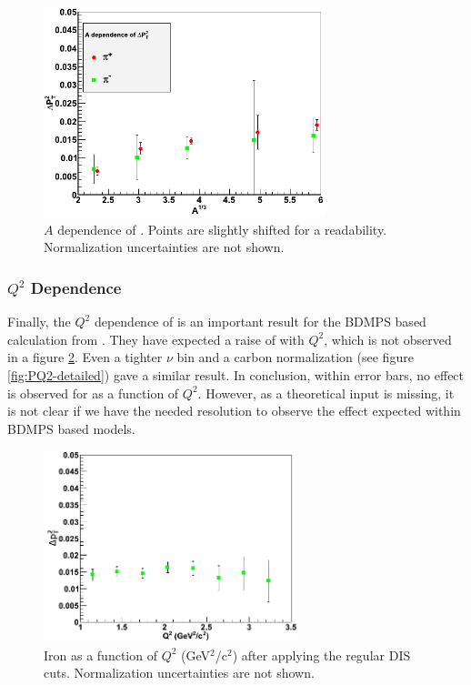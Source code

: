 \begin{figure}[tbp]
\centering
\includegraphics[width=8.2cm] {chap6-fig/F_PvA.png} 
\caption {$A$ dependence of \dptp. Points are slightly shifted for a readability. Normalization uncertainties are not shown.}
\label{fig:PA}
\end{figure}

\subsubsection{$Q^2$ Dependence}

Finally, the $Q^2$ dependence of \dpt is an important result for the BDMPS based 
calculation from \cite{Domdey:2008aq}. They have expected a raise of \dpt with $Q^2$, which is not observed in a figure \ref{fig:PQ2}. Even a tighter $\nu$ bin and a carbon normalization (see figure \ref{fig:PQ2-detailed}) gave a similar result. In conclusion, within error bars, no effect is observed for \dpt as a function of $Q^2$. However, as a theoretical input is missing, it is not clear if we have the needed resolution to observe the effect expected within BDMPS based models.

\begin{figure}[tbp]
\centering
\includegraphics[width=7.4cm] {chap6-fig/F_PvQ2.png} 
\caption {Iron \dpt as a function of $Q^2$ (GeV$^2$/c$^2$) after applying the regular DIS cuts. Normalization uncertainties are not shown.}
\label{fig:PQ2}
\end{figure}

